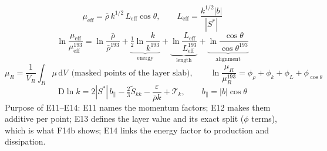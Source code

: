 \documentclass[10pt]{article}
\begin{document}
\begin{equation}
\mu_{\mathrm{eff}}=\bar\rho\,k^{1/2}\,L_{\mathrm{eff}}\cos\theta,\qquad L_{\mathrm{eff}}=\frac{k^{1/2}|b|}{|S^*|}
\tag{E11}
\end{equation}
\begin{equation}
\ln\frac{\mu_{\mathrm{eff}}}{\mu_{\mathrm{eff}}^{193}}=\ln\frac{\bar\rho}{\bar\rho^{193}}
+\underbrace{\tfrac12\ln\frac{k}{k^{193}}}_{\text{energy}}
+\underbrace{\ln\frac{L_{\mathrm{eff}}}{L_{\mathrm{eff}}^{193}}}_{\text{length}}
+\underbrace{\ln\frac{\cos\theta}{\cos\theta^{193}}}_{\text{alignment}}
\tag{E12}
\end{equation}
\begin{equation}
\mu_R=\frac{1}{V_R}\int_R\mu\,\mathrm dV\ \ \text{(masked points of the layer slab)},\qquad
\ln\frac{\mu_R}{\mu_R^{193}}=\phi_\rho+\phi_k+\phi_{L}+\phi_{\cos\theta}
\tag{E13}
\end{equation}
\begin{equation}
\mathrm D\ln k=2|S^*|\,b_\parallel-\tfrac23\tilde S_{kk}-\frac{\varepsilon}{\bar\rho k}+\mathcal T_k,\qquad b_\parallel=|b|\cos\theta
\tag{E14}
\end{equation}
Purpose of E11--E14: E11 names the momentum factors; E12 makes them additive per point; E13 defines the
layer value and its exact split ($\phi$ terms), which is what F14b shows; E14 links the energy factor
to production and dissipation.
\end{document}
